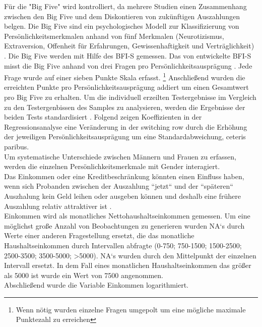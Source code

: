 \documentclass[11pt,a4paper]{article}
\begin{document}
Für die  "Big Five" wird kontrolliert, da mehrere Studien einen Zusammenhang zwischen den Big Five und dem Diskontieren von zukünftigen Auszahlungen belgen\parencite{carter2012religious}. Die Big Five sind ein psychologisches Modell zur Klassifizierung von Persönlichkeitsmerkmalen anhand von fünf Merkmalen (Neurotizismus, Extraversion, Offenheit für Erfahrungen, Gewissenhaftigkeit und Verträglichkeit) \parencite{becker2012relationship}. Die Big Five werden mit Hilfe des BFI-S gemessen. Das von \textcite{gerlitz2005erhebung} entwickelte BFI-S misst die Big Five anhand von drei Fragen pro Persönlichkeitsausprägung  \parencite{becker2012relationship}. Jede Frage wurde auf einer sieben Punkte Skala erfasst. \footnote{Wenn nötig wurden einzelne Fragen umgepolt um eine mögliche maximale Punktezahl zu erreichen} 
Anschließend wurden die erreichten Punkte pro Persönlichkeitsausprägung addiert um einen Gesamtwert pro Big Five  zu erhalten. Um die individuell erzeilten Testergebnisse im Vergleich zu den Testergenbissen des Samples zu analysieren, werden die Ergebnisse der beiden Tests standardisiert \parencite{wooldridge2015introductory}. Folgend zeigen Koeffizienten in der Regressionsanalyse eine Veränderung in der switching row durch die Erhöhung der jeweiligen Persönlichkeitsausprägung um eine Standardabweichung, ceteris paribus.\\

Um systematische Unterschiede zwischen Männern und Frauen zu erfassen, werden die einzelnen Persönlichkeitsmerkmale mit Gender interagiert.\\

Das Einkommen oder eine Kreditbeschränkung könnten einen Einfluss haben, wenn sich Probanden zwischen der Auszahlung “jetzt“ und der “späteren“ Auszhalung kein Geld leihen oder ausgeben können und deshalb eine frühere Auszahlung relativ attraktiver ist \parencite{dohmen2012interpreting}.\\ 
Einkommen wird als monatliches Nettohaushaltseinkommen gemessen. Um eine möglichst große Anzahl von Beobachtungen zu generieren wurden NA`s durch Werte einer anderen Fragestellung ersetzt, die das monatliche Haushaltseinkommen durch Intervallen  abfragte (0-750; 750-1500; 1500-2500; 2500-3500; 3500-5000; >5000)\parencite{dohmen2010risk}. NA`s  wurden durch den Mittelpunkt der einzelnen Intervall ersetzt. In dem Fall eines monatlichen Haushaltseinkommen das größer als 5000 ist wurde ein Wert von 7500 angenommen.\\
Abschließend wurde die Variable Einkommen logarithmiert. \\
\end{document}
